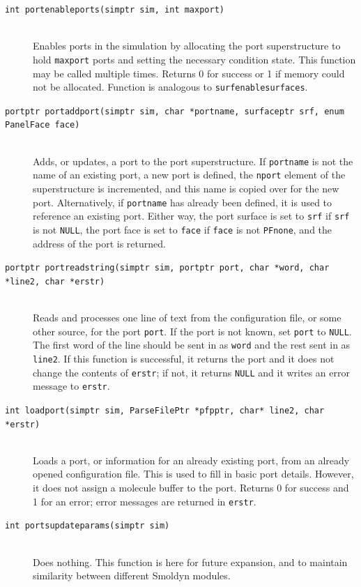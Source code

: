 \documentclass {scrbook}
\newcommand {\ttt} {\texttt}
\begin{document}
\begin{description}
\item[\ttt{int portenableports(simptr sim, int maxport)}]
\hfill \\
Enables ports in the simulation by allocating the port superstructure to hold \ttt{maxport} ports and setting the necessary condition state. This function may be called multiple times. Returns 0 for success or 1 if memory could not be allocated. Function is analogous to \ttt{surfenablesurfaces}.

\item[\ttt{portptr portaddport(simptr sim, char *portname, surfaceptr srf, enum PanelFace face)}]
\hfill \\
Adds, or updates, a port to the port superstructure. If \ttt{portname} is not the name of an existing port, a new port is defined, the \ttt{nport} element of the superstructure is incremented, and this name is copied over for the new port. Alternatively, if \ttt{portname} has already been defined, it is used to reference an existing port. Either way, the port surface is set to \ttt{srf} if \ttt{srf} is not \ttt{NULL}, the port face is set to \ttt{face} if \ttt{face} is not \ttt{PFnone}, and the address of the port is returned.

\item[\ttt{portptr portreadstring(simptr sim, portptr port, char *word, char *line2, char *erstr)}]
\hfill \\
Reads and processes one line of text from the configuration file, or some other source, for the port \ttt{port}. If the port is not known, set \ttt{port} to \ttt{NULL}. The first word of the line should be sent in as \ttt{word} and the rest sent in as \ttt{line2}. If this function is successful, it returns the port and it does not change the contents of \ttt{erstr}; if not, it returns \ttt{NULL} and it writes an error message to \ttt{erstr}.

\item[\ttt{int loadport(simptr sim, ParseFilePtr *pfpptr, char* line2, char *erstr)}]
\hfill \\
Loads a port, or information for an already existing port, from an already opened configuration file. This is used to fill in basic port details. However, it does not assign a molecule buffer to the port. Returns 0 for success and 1 for an error; error messages are returned in \ttt{erstr}.

\item[\ttt{int portsupdateparams(simptr sim)}]
\hfill \\
Does nothing. This function is here for future expansion, and to maintain similarity between different Smoldyn modules.


\end{description}
\end{document}
